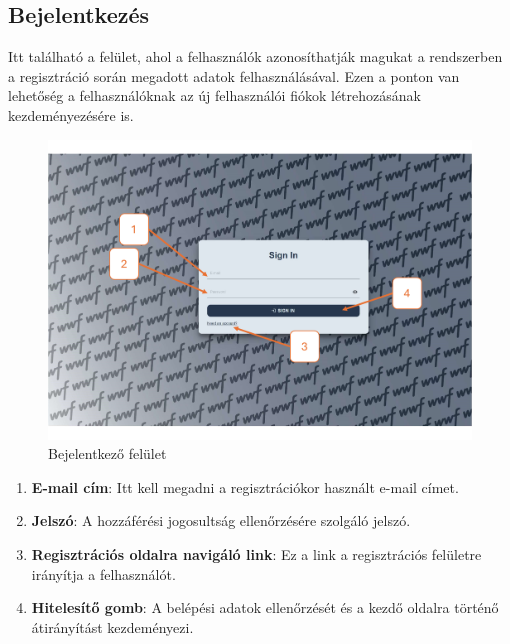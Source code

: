 \subsection{Bejelentkez\'es}
Itt található a felület, ahol a felhasználók azonosíthatják magukat a rendszerben a regisztráció során megadott adatok felhasználásával. Ezen a ponton van lehetőség a felhasználóknak az új felhasználói fiókok létrehozásának kezdeményezésére is.
\begin{figure}[H]
    \centering
    \includegraphics[width=14.0truecm]{images/login.pdf}
    \caption{Bejelentkező felület}
    \label{fig:login}
\end{figure}
\begin{enumerate}
  \item \textbf{E-mail cím}: Itt kell megadni a regisztrációkor használt e-mail címet.
  \item \textbf{Jelszó}: A hozzáférési jogosultság ellenőrzésére szolgáló jelszó.
  \item \textbf{Regisztrációs oldalra navigáló link}: Ez a link a regisztrációs felületre irányítja a felhasználót.
  \item \textbf{Hitelesítő gomb}: A belépési adatok ellenőrzését és a kezdő oldalra történő átirányítást kezdeményezi.
\end{enumerate}
